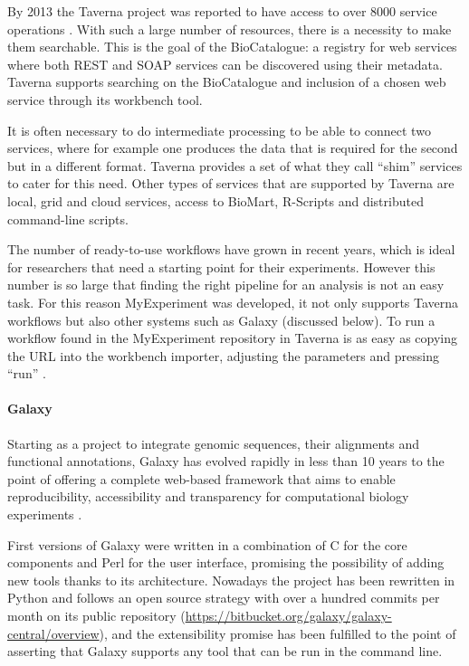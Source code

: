 By 2013 the Taverna project was reported to have access to over 8000 service operations \cite{WOL2013}. With such a large number of resources, there is a necessity to make them searchable. This is the goal of the BioCatalogue: a registry for web services where both REST and SOAP services can be discovered using their metadata. Taverna supports searching on the BioCatalogue and inclusion of a chosen web service through its workbench tool.

It is often necessary to do intermediate processing to be able to connect two services, where for example one produces the data that is required for the second but in a different format. Taverna provides a set of what they call ``shim'' services to cater for this need. Other types of services that are supported by Taverna are local, grid and cloud services, access to BioMart, R-Scripts and distributed command-line scripts.

The number of ready-to-use workflows have grown in recent years, which is ideal for researchers that need a starting point for their experiments. However this number is so large that finding the right pipeline for an analysis is not an easy task. For this reason MyExperiment was developed, it not only supports Taverna workflows but also other systems such as Galaxy (discussed below). To run a workflow found in the MyExperiment repository in Taverna is as easy as copying the URL into the workbench importer, adjusting the parameters and pressing ``run'' \cite{WOL2013}.

\paragraph{Galaxy}
Starting as a project to integrate genomic sequences, their alignments and functional annotations, Galaxy has evolved rapidly in less than 10 years to the point of offering a complete web-based framework that aims to enable reproducibility, accessibility and transparency for computational biology experiments \cite{GIA2005, GOE2010}.

First versions of Galaxy were written in a combination of C for the core components and Perl for the user interface, promising the possibility of adding new tools thanks to its architecture. Nowadays the project has been rewritten in Python and follows an open source strategy with over a hundred commits per month on its public repository (\url{https://bitbucket.org/galaxy/galaxy-central/overview}), and the extensibility promise has been fulfilled to the point of asserting that Galaxy supports any tool that can be run in the command line.


